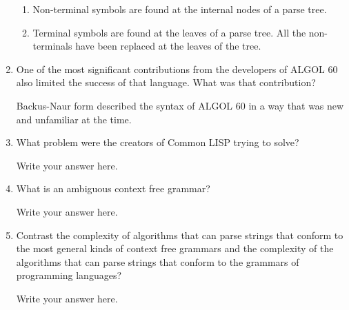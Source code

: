 \begin{enumerate}
  \begin{answer}

  \begin{enumerate}
    \item Non-terminal symbols are found at the internal nodes of a parse tree.
    \item Terminal symbols are found at the leaves of a parse tree. All the
      non-terminals have been replaced at the leaves of the tree.
    \end{enumerate}

    \end{answer}


  \item One of the most significant contributions from the developers
    of ALGOL 60 also limited the success of that language. What was
    that contribution?

  \begin{answer}

    Backus-Naur form described the syntax of ALGOL 60 in a way that was new
    and unfamiliar at the time.

    \end{answer}

  \item What problem were the creators of Common LISP trying to solve?

  \begin{answer}

    Write your answer here.

    \end{answer}

  \item What is an ambiguous context free grammar?

  \begin{answer}

    Write your answer here.

    \end{answer}

  \item Contrast the complexity of algorithms that can parse strings
    that conform to the most general kinds of context free grammars
    and the complexity of the algorithms that can parse strings that
    conform to the grammars of programming languages?

  \begin{answer}

    Write your answer here.

    \end{answer}


\end{enumerate}

